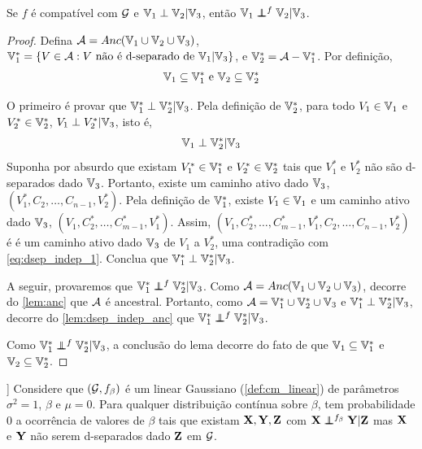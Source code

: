 \begin{lemma}
 \label{lem:dsep_indep}
 Se $f$ é compatível com ${\mathcal G}$ e
 ${\mathbb V}_1 \perp {\mathbb V}_2 | {\mathbb V}_3$, então
 ${\mathbb V}_1 \perp\!\!\!\!\perp^f {\mathbb V}_2 | {\mathbb V}_3$.
\end{lemma}

\begin{proof}
 Defina ${\mathcal A} = Anc({\mathbb V}_1 \cup {\mathbb V}_2 \cup {\mathbb V}_3)$,
 ${\mathbb V}^*_1 = \{V \in {\mathcal A}: V \text{ não é d-separado de } {\mathbb V}_1 | {\mathbb V}_3\}$, e ${\mathbb V}^*_2 = {\mathcal A} - {\mathbb V}^*_1$.
 Por definição,
 \begin{align}
  \label{eq:dsep_indep_0}
  {\mathbb V}_1 \subseteq {\mathbb V}^*_1 \text{ e }
  {\mathbb V}_2 \subseteq {\mathbb V}^*_2
 \end{align}

 O primeiro é provar que
 ${\mathbb V}^*_1 \perp {\mathbb V}^*_2 | {\mathbb V}_3$.
 Pela definição de ${\mathbb V}^*_2$, 
 para todo $V_1 \in {\mathbb V}_1$ e $V^*_2 \in {\mathbb V}^*_2$, 
 $V_1 \perp V^*_2 | {\mathbb V}_3$, isto é,
\begin{align}
 \label{eq:dsep_indep_1}
 {\mathbb V}_1 \perp {\mathbb V}^*_2 | {\mathbb V}_3
\end{align}
 Suponha por absurdo que existam
 $V^*_1 \in {\mathbb V}^*_1$ e $V^*_2 \in {\mathbb V}^*_2$
 tais que $V^*_1$ e $V^*_2$ 
 não são d-separados dado ${\mathbb V}_3$.
 Portanto, existe um caminho ativo dado ${\mathbb V}_3$,
 $(V^*_1,C_2,\ldots,C_{n-1},V^*_2)$.
 Pela definição de ${\mathbb V}^*_1$, existe
 $V_1 \in {\mathbb V}_1$ e um caminho ativo dado ${\mathbb V}_3$,
 $(V_1,C^*_2,\ldots,C^*_{m-1},V^*_1)$. Assim,
 $(V_1,C^*_2,\ldots,C^*_{m-1},
 V^*_1,C_2,\ldots,C_{n-1},V^*_2)$ é
 é um caminho ativo dado ${\mathbb V}_3$ de
 $V_1$ a $V^*_2$, uma contradição com
 \cref{eq:dsep_indep_1}. Conclua que
 ${\mathbb V}^*_1 \perp {\mathbb V}^*_2 | {\mathbb V}_3$.

 A seguir, provaremos que
 ${\mathbb V}^*_1 \perp\!\!\!\!\perp^f {\mathbb V}^*_2 | {\mathbb V}_3$.
 Como ${\mathcal A} = Anc({\mathbb V}_1 \cup {\mathbb V}_2 \cup {\mathbb V}_3)$,
 decorre do \cref{lem:anc} que
 ${\mathcal A}$ é ancestral. Portanto, como
 ${\mathcal A} = {\mathbb V}^*_1 \cup {\mathbb V}^*_2 \cup {\mathbb V}_3$ e
 ${\mathbb V}^*_1 \perp {\mathbb V}^*_2 | {\mathbb V}_3$, decorre do
 \cref{lem:dsep_indep_anc} que
 ${\mathbb V}^*_1 \perp\!\!\!\!\perp^f {\mathbb V}^*_2 | {\mathbb V}_3$.

Como ${\mathbb V}^*_1 \perp\!\!\!\!\perp^f {\mathbb V}^*_2 | {\mathbb V}_3$,
 a conclusão do lema decorre do fato de que
 ${\mathbb V}_1 \subseteq {\mathbb V}^*_1$ e 
 ${\mathbb V}_2 \subseteq {\mathbb V}^*_2$. 
\end{proof}

\begin{theorem}[\citet{Spirtes2000}[p.66]]
 \label{thm:vanishing_cor}
 Considere que $({\mathcal G}, f_{\beta})$ é um \CM linear Gaussiano (\cref{def:cm_linear})
 de parâmetros $\sigma^2 = 1$, $\beta$ e $\mu = 0$.
 Para qualquer distribuição contínua sobre $\beta$,
 tem probabilidade $0$ a ocorrência de valores de $\beta$ tais que
 existam ${\mathbf{X}}, {\mathbf{Y}}, {\mathbf{Z}}$ com ${\mathbf{X}} \perp\!\!\!\!\perp^{f_\beta} {\mathbf{Y}} | {\mathbf{Z}}$ mas
 ${\mathbf{X}}$ e ${\mathbf{Y}}$ não serem d-separados dado ${\mathbf{Z}}$ em ${\mathcal G}$.
\end{theorem}

